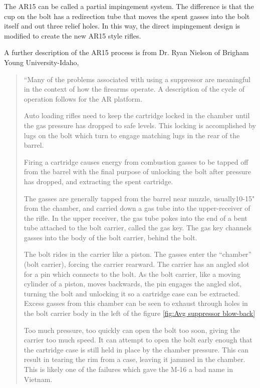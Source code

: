 The AR15 can be called a partial impingement system. The difference is that the cup on the bolt has a redirection tube that moves the spent gasses into the bolt itself and out three relief holes. In this way, the direct impingement design is modified to create the new AR15 style rifles.



A further description of the AR15 process is from Dr. Ryan Nielson of Brigham Young University-Idaho,

\begin{quote}
	
	``Many of the problems associated with using a suppressor are meaningful in the context of how the firearms operate.  A description of the cycle of operation follows for the AR platform.
	
	
	
	Auto loading rifles need to keep the cartridge locked in the chamber until the gas pressure has dropped to safe levels.  This locking is accomplished by lugs on the bolt which turn to engage matching lugs in the rear of the barrel.
	
	
	
	Firing a cartridge causes energy from combustion gasses to be tapped off from the barrel with the final purpose of unlocking the bolt after pressure has dropped, and extracting the spent cartridge.
	
	
	
	The gasses are generally tapped from the barrel near muzzle, usually10-15" from the chamber, and carried down a gas tube into the upper-receiver of the rifle.  In the upper receiver, the gas tube pokes into the end of a bent tube attached to the bolt carrier, called the gas key.  The gas key channels gasses into the body of the bolt carrier, behind the bolt.
	
	
	
	The bolt rides in the carrier like a piston.  The gasses enter the “chamber” (bolt carrier), forcing the carrier rearward.  The carrier has an angled slot for a pin which connects to the bolt.  As the bolt carrier, like a moving cylinder of a piston, moves backwards, the pin engages the angled slot, turning the bolt and unlocking it so a cartridge case can be extracted.   Excess gasses from this chamber can be seen to exhaust through holes in the bolt carrier body in the left of the figure \ref{fig:Avg suppressor blow-back}
	
	
	
	Too much pressure, too quickly can open the bolt too soon, giving the carrier too much speed.  It can attempt to open the bolt early enough that the cartridge case is still held in place by the chamber pressure.  This can result in tearing the rim from a case, leaving it jammed in the chamber.   This is likely one of the failures which gave the M-16 a bad name in Vietnam.
	

\end{quote}
